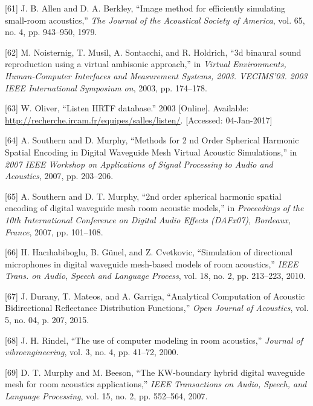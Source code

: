 \documentclass[]{scrreprt}
\begin{document}
\hypertarget{ref-allenux5fimageux5f1979}{}
{[}61{]} J. B. Allen and D. A. Berkley, ``Image method for efficiently
simulating small-room acoustics,'' \emph{The Journal of the Acoustical
Society of America}, vol. 65, no. 4, pp. 943--950, 1979.

\hypertarget{ref-noisternigux5f3dux5f2003}{}
{[}62{]} M. Noisternig, T. Musil, A. Sontacchi, and R. Holdrich, ``3d
binaural sound reproduction using a virtual ambisonic approach,'' in
\emph{Virtual Environments, Human-Computer Interfaces and Measurement
Systems, 2003. VECIMS'03. 2003 IEEE International Symposium on}, 2003,
pp. 174--178.

\hypertarget{ref-oliverux5flistenux5f2003}{}
{[}63{]} W. Oliver, ``Listen HRTF database.'' 2003 {[}Online{]}.
Available: \url{http://recherche.ircam.fr/equipes/salles/listen/}.
{[}Accessed: 04-Jan-2017{]}

\hypertarget{ref-southernux5fmethodsux5f2007}{}
{[}64{]} A. Southern and D. Murphy, ``Methods for 2 nd Order Spherical
Harmonic Spatial Encoding in Digital Waveguide Mesh Virtual Acoustic
Simulations,'' in \emph{2007 IEEE Workshop on Applications of Signal
Processing to Audio and Acoustics}, 2007, pp. 203--206.

\hypertarget{ref-southernux5f2ndux5f2007}{}
{[}65{]} A. Southern and D. T. Murphy, ``2nd order spherical harmonic
spatial encoding of digital waveguide mesh room acoustic models,'' in
\emph{Proceedings of the 10th International Conference on Digital Audio
Effects (DAFx07), Bordeaux, France}, 2007, pp. 101--108.

\hypertarget{ref-hacihabibogluux5fsimulationux5f2010}{}
{[}66{]} H. Hacıhabiboglu, B. Günel, and Z. Cvetkovic, ``Simulation of
directional microphones in digital waveguide mesh-based models of room
acoustics,'' \emph{IEEE Trans. on Audio, Speech and Language Process},
vol. 18, no. 2, pp. 213--223, 2010.

\hypertarget{ref-duranyux5fanalyticalux5f2015}{}
{[}67{]} J. Durany, T. Mateos, and A. Garriga, ``Analytical Computation
of Acoustic Bidirectional Reflectance Distribution Functions,''
\emph{Open Journal of Acoustics}, vol. 5, no. 04, p. 207, 2015.

\hypertarget{ref-rindelux5fuseux5f2000}{}
{[}68{]} J. H. Rindel, ``The use of computer modeling in room
acoustics,'' \emph{Journal of vibroengineering}, vol. 3, no. 4, pp.
41--72, 2000.

\hypertarget{ref-murphyux5fkw-boundaryux5f2007}{}
{[}69{]} D. T. Murphy and M. Beeson, ``The KW-boundary hybrid digital
waveguide mesh for room acoustics applications,'' \emph{IEEE
Transactions on Audio, Speech, and Language Processing}, vol. 15, no. 2,
pp. 552--564, 2007.
\end{document}
